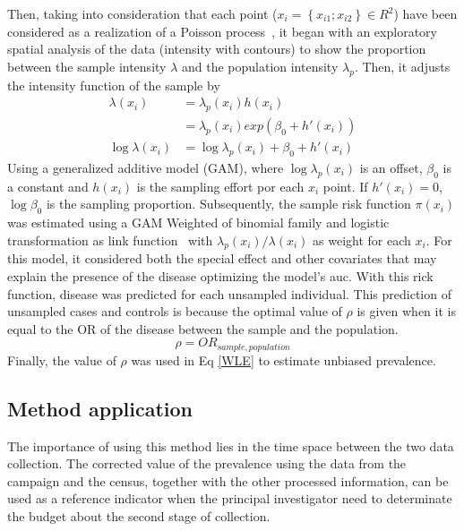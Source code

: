 \documentclass[10pt,letterpaper]{article}
\begin{document}
Then, taking into consideration that each point ($x_i = \left\{x_{i1}; x_{i2} \right\} \in R^2$) have been considered as a realization of a Poisson process~\cite{baddeley2015spatial}, it began with an exploratory spatial analysis of the data (intensity with contours) to show the proportion between the sample intensity $\lambda$ and the population intensity $\lambda_p$. Then, it adjusts the intensity function of the sample by
\begin{align*}
	\lambda(x_i) &= \lambda_p(x_i) h(x_i)\\
	&= \lambda_p(x_i) exp \left(\beta_0 + h'(x_i)\right)\\
	\log \lambda(x_i) &= \log \lambda_p(x_i) + \beta_0 + h'(x_i)
\end{align*}
Using a generalized additive model (GAM), where $\log \lambda_p(x_i)$ is an offset, $\beta_0$ is a constant and $h(x_i)$ is the sampling effort por each $x_i$ point. If $h'(x_i) = 0$, $\log \beta_0$ is the sampling proportion. Subsequently, the sample risk function $\pi(x_i)$ was estimated using a GAM Weighted of binomial family and logistic transformation as link function~\cite{friedman2001elements} with $\lambda_p(x_i)/\lambda(x_i)$ as weight for each $x_i$. For this model, it considered both the special effect and other covariates that may explain the presence of the disease optimizing the model's auc. With this rick function, disease was predicted for each unsampled individual. This prediction of unsampled cases and controls is because the optimal value of $\rho$ is given when it is equal to the OR of the disease between the sample and the population.
\begin{equation*}
    \rho = OR_{sample,population}
\end{equation*}
Finally, the value of $\rho$ was used in Eq \ref{WLE} to estimate unbiased prevalence.
\subsection*{Method application}
The importance of using this method lies in the time space between the two data collection. The corrected value of the prevalence using the data from the campaign and the census, together with the other processed information, can be used as a reference indicator when the principal investigator need to determinate the budget about the second stage of collection.



\end{document}
